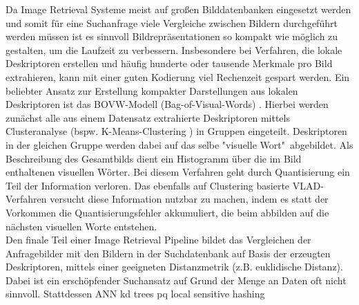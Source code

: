 Da Image Retrieval Systeme meist auf großen Bilddatenbanken eingesetzt werden und somit für eine Suchanfrage viele Vergleiche zwischen Bildern durchgeführt werden müssen ist es sinnvoll Bildrepräsentationen so kompakt wie möglich zu gestalten, um die Laufzeit zu verbessern. Insbesondere bei Verfahren, die lokale Deskriptoren erstellen und häufig hunderte oder tausende Merkmale pro Bild extrahieren, kann mit einer guten Kodierung viel Rechenzeit gespart werden. Ein beliebter Ansatz zur Erstellung kompakter Darstellungen aus lokalen Deskriptoren ist das BOVW-Modell (Bag-of-Visual-Words) \cite{bow}. Hierbei werden zunächst alle aus einem Datensatz extrahierte Deskriptoren mittels Clusteranalyse (bspw. K-Means-Clustering \cite{k_means}) in Gruppen eingeteilt. Deskriptoren in der gleichen Gruppe werden dabei auf das selbe "visuelle Wort"\ abgebildet. Als Beschreibung des Gesamtbilds dient ein Histogramm über die im Bild enthaltenen visuellen Wörter. Bei diesem Verfahren geht durch Quantisierung ein Teil der Information verloren. Das ebenfalls auf Clustering basierte VLAD-Verfahren \cite{vlad} versucht diese Information nutzbar zu machen, indem es statt der Vorkommen die Quantisierungsfehler akkumuliert, die beim abbilden auf die nächsten visuellen Worte entstehen. \\
Den finale Teil einer Image Retrieval Pipeline bildet das Vergleichen der Anfragebilder mit den Bildern in der Suchdatenbank auf Basis der erzeugten Deskriptoren, mittels einer geeigneten Distanzmetrik (z.B. euklidische Distanz). Dabei ist ein erschöpfender Suchansatz auf Grund der Menge an Daten oft nicht sinnvoll. Stattdessen 
ANN kd trees pq local sensitive hashing
